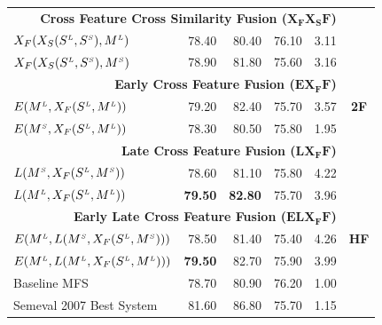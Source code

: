 \begin{table}[htp!]
\begin{tabular}{@{}lrrrrc@{}}
 \midrule
                   \multicolumn{5}{r}{\textbf{Cross Feature Cross Similarity Fusion ($\mathbf{X_FX_SF}$)}}  & \multirow{9}{*}{\textbf{2F}}     \\ %
	   
       $X_F(X_S(S^{\scriptscriptstyle L}, S^{\scriptscriptstyle S}), M^{\scriptscriptstyle L})$		& 78.40 & 80.40 & 76.10 & 3.11 \\	   
       $X_F(X_S(S^{\scriptscriptstyle L}, S^{\scriptscriptstyle S}), M^{\scriptscriptstyle S})$		& 78.90 & 81.80 & 75.60 & 3.16\\	   
                   \multicolumn{5}{r}{\textbf{Early Cross Feature Fusion ($\mathbf{EX_FF}$)}}       \\ %
       
       $E(M^{\scriptscriptstyle L}, X_F(S^{\scriptscriptstyle L}, M^{\scriptscriptstyle L}))$		& 79.20 & 82.40 & 75.70 & 3.57\\	   
	   $E(M^{\scriptscriptstyle S}, X_F(S^{\scriptscriptstyle L}, M^{\scriptscriptstyle L}))$		& 78.30 & 80.50 & 75.80 & 1.95\\	   
                   \multicolumn{5}{r}{\textbf{Late Cross Feature Fusion ($\mathbf{LX_FF}$)}}       \\ %
	   $L(M^{\scriptscriptstyle S}, X_F(S^{\scriptscriptstyle L}, M^{\scriptscriptstyle S}))$		& 78.60 & 81.10 & 75.80 & 4.22\\	   
	   $L(M^{\scriptscriptstyle L}, X_F(S^{\scriptscriptstyle L}, M^{\scriptscriptstyle L}))$		& \textbf{79.50} & \textbf{82.80} & 75.70 & 3.96\\	   
       \midrule
                   \multicolumn{5}{r}{\textbf{Early Late Cross Feature Fusion ($\mathbf{ELX_FF}$)}}     & \multirow{3}{*}{\textbf{HF}}  \\ %
	   $E(M^{\scriptscriptstyle L}, L(M^{\scriptscriptstyle S}, X_F(S^{\scriptscriptstyle L}, M^{\scriptscriptstyle S})))$		& 78.50 & 81.40 & 75.40 & 4.26\\	   
	   $E(M^{\scriptscriptstyle L}, L(M^{\scriptscriptstyle L}, X_F(S^{\scriptscriptstyle L}, M^{\scriptscriptstyle L})))$		& \textbf{79.50} & 82.70 & 75.90 & 3.99\\
	   \midrule
	   \midrule
	   

	   Baseline MFS		& 78.70 & 80.90 & 76.20 & 1.00\\ 	   	 	    
	   Semeval 2007 Best System& 81.60 & 86.80 & 75.70 & 1.15\\ 	 		   
       \bottomrule
\end{tabular}
\end{table}


